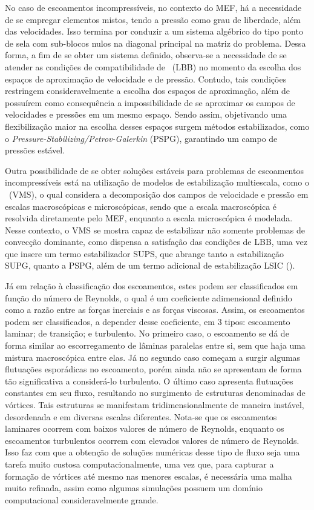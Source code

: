 No caso de escoamentos incompressíveis, no contexto do MEF, há a necessidade de se empregar elementos mistos, tendo a pressão como grau de liberdade, além das velocidades. Isso termina por conduzir a um sistema algébrico do tipo ponto de sela com sub-blocos nulos na diagonal principal na matriz do problema. Dessa forma, a fim de se obter um sistema definido, observa-se a necessidade de se atender as condições de compatibilidade de \LBB\ (LBB) no momento da escolha dos espaços de aproximação de velocidade e de pressão. Contudo, tais condições restringem consideravelmente a escolha dos espaços de aproximação, além de possuírem como consequência a impossibilidade de se aproximar os campos de velocidades e pressões em um mesmo espaço. Sendo assim, objetivando uma flexibilização maior na escolha desses espaços surgem métodos estabilizados, como o \textit{Pressure-Stabilizing/Petrov-Galerkin} (PSPG), garantindo um campo de pressões estável.

Outra possibilidade de se obter soluções estáveis para problemas de escoamentos incompressíveis está na utilização de modelos de estabilização multiescala, como o \VMS\ (VMS), o qual considera a decomposição dos campos de velocidade e pressão em escalas macroscópicas e microscópicas, sendo que a escala macroscópica é resolvida diretamente pelo MEF, enquanto a escala microscópica é modelada. Nesse contexto, o VMS se mostra capaz de estabilizar não somente problemas de convecção dominante, como dispensa a satisfação das condições de LBB, uma vez que insere um termo estabilizador SUPS, que abrange tanto a estabilização SUPG, quanto a PSPG, além de um termo adicional de estabilização LSIC (\LSIC).

Já em relação à classificação dos escoamentos, estes podem ser classificados em função do número de Reynolds, o qual é um coeficiente adimensional definido como a razão entre as forças inerciais e as forças viscosas. Assim, os escoamentos podem ser classificados, a depender desse coeficiente, em 3 tipos: escoamento laminar; de transição; e turbulento. No primeiro caso, o escoamento se dá de forma similar ao escorregamento de lâminas paralelas entre si, sem que haja uma mistura macroscópica entre elas. Já no segundo caso começam a surgir algumas flutuações esporádicas no escoamento, porém ainda não se apresentam de forma tão significativa a considerá-lo turbulento. O último caso apresenta flutuações constantes em seu fluxo, resultando no surgimento de estruturas denominadas de vórtices. Tais estruturas se manifestam tridimensionalmente de maneira instável, desordenada e em diversas escalas diferentes. Nota-se que os escoamentos laminares ocorrem com baixos valores de número de Reynolds, enquanto os escoamentos turbulentos ocorrem com elevados valores de número de Reynolds. Isso faz com que a obtenção de soluções numéricas desse tipo de fluxo seja uma tarefa muito custosa computacionalmente, uma vez que, para capturar a formação de vórtices até mesmo nas menores escalas, é necessária uma malha muito refinada, assim como algumas simulações possuem um domínio computacional consideravelmente grande.

